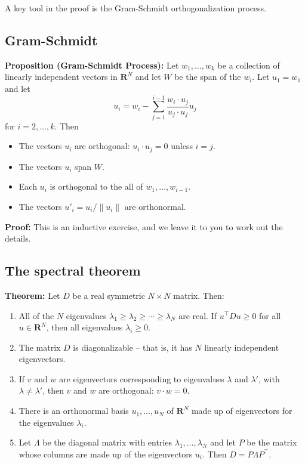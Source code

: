 \documentclass[
  11pt,
  letterpaper,
]{scrbook}
\providecommand{\tightlist}{%
  \setlength{\itemsep}{0pt}\setlength{\parskip}{0pt}}\usepackage{longtable,booktabs,array}
\theoremstyle{plain}
\theoremstyle{remark}
\begin{document}
A key tool in the proof is the Gram-Schmidt orthogonalization process.

\hypertarget{sec-gsprocess}{%
\subsection{Gram-Schmidt}\label{sec-gsprocess}}

\textbf{Proposition (Gram-Schmidt Process):} Let \(w_{1},\ldots, w_{k}\)
be a collection of linearly independent vectors in \(\mathbf{R}^{N}\)
and let \(W\) be the span of the \(w_{i}\). Let \(u_{1} = w_{1}\) and
let \[
u_{i} = w_{i} - \sum_{j=1}^{i-1} \frac{w_{i}\cdot u_{j}}{u_{j}\cdot u_{j}}u_{j}
\] for \(i=2,\ldots, k\). Then

\begin{itemize}
\tightlist
\item
  The vectors \(u_{i}\) are orthogonal: \(u_{i}\cdot u_{j}=0\) unless
  \(i=j\).
\item
  The vectors \(u_{i}\) span \(W\).
\item
  Each \(u_{i}\) is orthogonal to the all of \(w_{1},\ldots, w_{i-1}\).
\item
  The vectors \(u'_{i} = u_{i}/\|u_{i}\|\) are orthonormal.
\end{itemize}

\textbf{Proof:} This is an inductive exercise, and we leave it to you to
work out the details.

\hypertarget{the-spectral-theorem}{%
\subsection{The spectral theorem}\label{the-spectral-theorem}}

\textbf{Theorem:} Let \(D\) be a real symmetric \(N\times N\) matrix.
Then:

\begin{enumerate}
\def\labelenumi{\arabic{enumi}.}
\tightlist
\item
  All of the \(N\) eigenvalues
  \(\lambda_1\ge \lambda_2\ge \cdots \ge \lambda_{N}\) are real. If
  \(u^{\intercal}Du\ge 0\) for all \(u\in\mathbf{R}^{N}\), then all
  eigenvalues \(\lambda_{i}\ge 0\).
\item
  The matrix \(D\) is diagonalizable -- that is, it has \(N\) linearly
  independent eigenvectors.
\item
  If \(v\) and \(w\) are eigenvectors corresponding to eigenvalues
  \(\lambda\) and \(\lambda'\), with \(\lambda\not=\lambda'\), then
  \(v\) and \(w\) are orthogonal: \(v\cdot w=0\).
\item
  There is an orthonormal basis \(u_{1},\ldots, u_{N}\) of
  \(\mathbf{R}^{N}\) made up of eigenvectors for the eigenvalues
  \(\lambda_{i}\).
\item
  Let \(\Lambda\) be the diagonal matrix with entries
  \(\lambda_{1},\ldots, \lambda_{N}\) and let \(P\) be the matrix whose
  columns are made up of the eigenvectors \(u_{i}\). Then
  \(D=P\Lambda P^{\intercal}\).
\end{enumerate}
\end{document}
